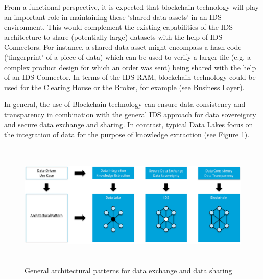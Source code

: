 From a functional perspective, it is expected that blockchain technology will play an important role in maintaining these ‘shared data assets’ in an IDS environment. This would complement the existing capabilities of the IDS architecture to share (potentially large) datasets with the help of IDS Connectors. For instance, a shared data asset might encompass a hash code (‘fingerprint’ of a piece of data) which can be used to verify a larger file (e.g. a complex product design for which an order was sent) being shared with the help of an IDS Connector. In terms of the IDS-RAM, blockchain technology could be used for the Clearing House or the Broker, for example (see Business Layer).

In general, the use of Blockchain technology can ensure data consistency and transparency in combination with the general IDS approach for data sovereignty and secure data exchange and sharing. In contrast, typical Data Lakes focus on the integration of data for the purpose of knowledge extraction (see Figure \ref{fig:_general_architectural_patterns_for_data_exchange_and_data_sharing}).




\begin{figure}[h]
	\begin{Center}
		\includegraphics[width=6.6in,height=2.37in]{./media/image15.png}
		\caption{ General architectural patterns for data exchange and data sharing}
		\label{fig:_general_architectural_patterns_for_data_exchange_and_data_sharing}
	\end{Center}
\end{figure}




